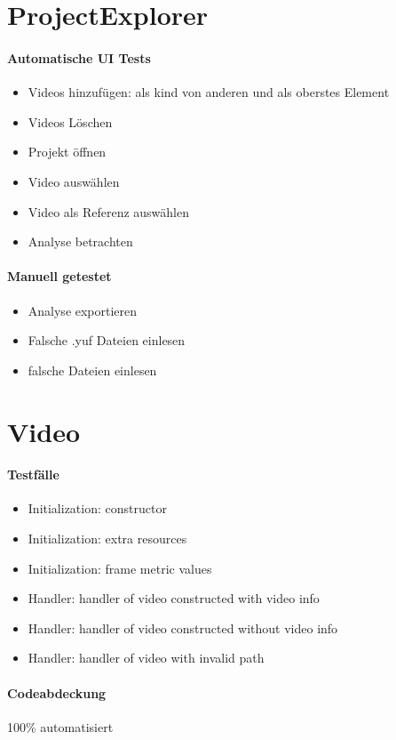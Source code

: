 \section{ProjectExplorer}
\paragraph{Automatische UI Tests}
\begin{itemize}
\item Videos hinzufügen: als kind von anderen und als oberstes Element
\item Videos Löschen
\item Projekt öffnen
\item Video auswählen
\item Video als Referenz auswählen
\item Analyse betrachten 
\end{itemize}
\paragraph{Manuell getestet}
\begin{itemize}
\item Analyse exportieren
\item Falsche .yuf Dateien einlesen
\item falsche Dateien einlesen
\end{itemize}

\section{Video}
\paragraph*{Testfälle}
\begin{itemize}
\item Initialization: constructor
\item Initialization: extra resources
\item Initialization: frame metric values
\item Handler: handler of video constructed with video info
\item Handler: handler of video constructed without video info
\item Handler: handler of video with invalid path
\end{itemize}

\paragraph*{Codeabdeckung}
100\% automatisiert

